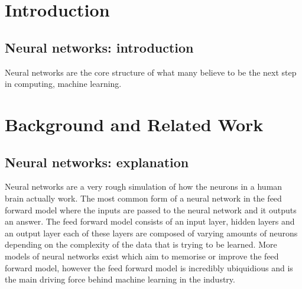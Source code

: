 \documentclass[a4paper,twoside,phd]{BYUPhys}
\begin{document}
 \frontmatter


 \makepreliminarypages


\doublespace
%

%

 \clearemptydoublepage
\singlespace
 \tableofcontents

\clearemptydoublepage
\listoffigures

\clearemptydoublepage
\listoftables

\clearemptydoublepage

\mainmatter
%
\chapter{Introduction}
\label{chap:Introduction}


\section{Neural networks: introduction}
Neural networks are the core structure of what many believe to be the next step in computing, machine learning. 


\chapter{Background and Related Work}
\label{chap:LitReview}

\section{Neural networks: explanation}
Neural networks are a very rough simulation of how the neurons in a human brain actually work. The most common form of a neural network in the feed forward model where the inputs are passed to the neural network and it outputs an answer. The feed forward model consists of an input layer, hidden layers and an output layer each of these layers are composed of varying amounts of neurons depending on the complexity of the data that is trying to be learned. More models of neural networks exist which aim to memorise or improve the feed forward model, however the feed forward model is incredibly ubiquidious and is the main driving force behind machine learning in the industry. 
\end{document}
